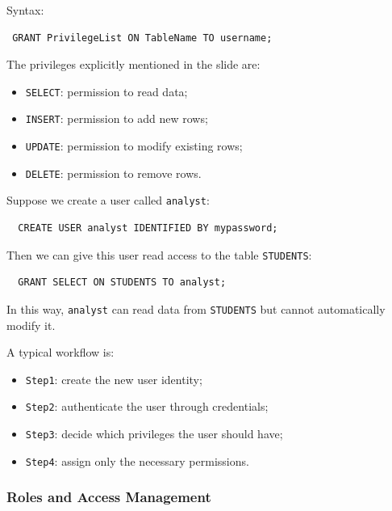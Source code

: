  Syntax:

 \begin{verbatim}
 GRANT PrivilegeList ON TableName TO username;
 \end{verbatim}
 \vspace{-0.4cm}

 The privileges explicitly mentioned in the slide are:

 \begin{itemize}
  \item \texttt{SELECT}: permission to read data;
  \item \texttt{INSERT}: permission to add new rows;
  \item \texttt{UPDATE}: permission to modify existing rows;
  \item \texttt{DELETE}: permission to remove rows.
 \end{itemize}

 \pagebreak

 \begin{example}
  Suppose we create a user called \texttt{analyst}:
  \begin{verbatim}
  CREATE USER analyst IDENTIFIED BY mypassword;
  \end{verbatim}
  \vspace{-0.4cm}

  Then we can give this user read access to the table \texttt{STUDENTS}:
  \begin{verbatim}
  GRANT SELECT ON STUDENTS TO analyst;
  \end{verbatim}
  \vspace{-0.4cm}

  In this way, \texttt{analyst} can read data from \texttt{STUDENTS} but cannot automatically modify it.
 \end{example}

 \begin{example}
  A typical workflow is:
  \begin{itemize}
   \item \texttt{Step1}: create the new user identity;
   \item \texttt{Step2}: authenticate the user through credentials;
   \item \texttt{Step3}: decide which privileges the user should have;
   \item \texttt{Step4}: assign only the necessary permissions.
  \end{itemize}
 \end{example}

 \subsubsection{Roles and Access Management}

